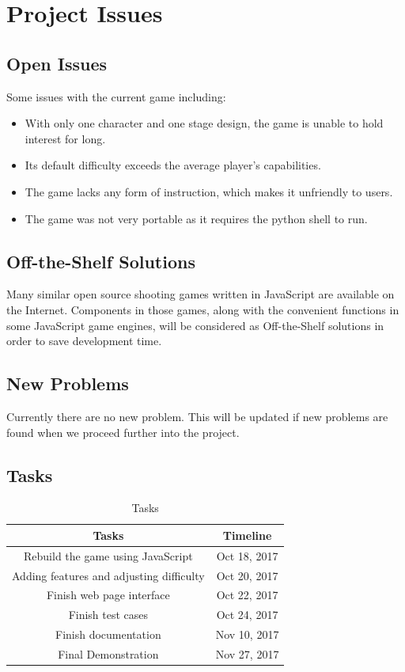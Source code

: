 \documentclass[12pt, titlepage]{article}
\begin{document}
\section{Project Issues}

\subsection{Open Issues}
Some issues with the current game including:

\begin{itemize}
\item With only one character and one stage design, the game is unable to hold interest for long.
\item Its default difficulty exceeds the average player's capabilities.
\item The game lacks any form of instruction, which makes it unfriendly to users.
\item The game was not very portable as it requires the python shell to run.
\end{itemize}

\subsection{Off-the-Shelf Solutions}
Many similar open source shooting games written in JavaScript are available on the Internet. Components in those games, along with the convenient functions in some JavaScript game engines, will be considered as Off-the-Shelf solutions in order to save development time.

\subsection{New Problems}
Currently there are no new problem. This will be updated if new problems are found when we proceed further into the project.

\subsection{Tasks}
\begin{center}
\begin{table}[H]
    \caption{Tasks} 
    \begin{tabular}{|c|c|}
	\hline
	Tasks & Timeline \\ \hline
	Rebuild the game using JavaScript  & Oct 18, 2017 \\ \hline
	Adding features and adjusting difficulty & Oct 20, 2017 \\ \hline
	Finish web page interface & Oct 22, 2017 \\ \hline
	Finish test cases & Oct 24, 2017 \\ \hline
	Finish documentation & Nov 10, 2017 \\ \hline
	Final Demonstration & Nov 27, 2017 \\ \hline
    \end{tabular}
\end{table}
\end{center}
\end{document}
